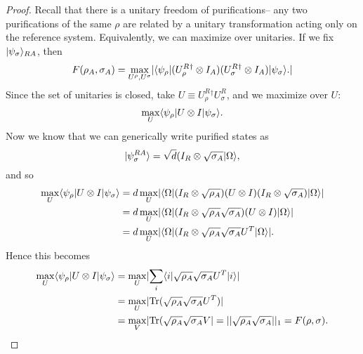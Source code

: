 \begin{thm}[Uhlmann]
\begin{proof}
        Recall that there is a unitary freedom of purifications-- any two purifications of the same $\rho$ are related by a unitary transformation acting only on the reference system. Equivalently, we can maximize over unitaries. If we fix $\lvert\psi_\sigma\rangle_{RA}$, then
        \begin{equation}
            F(\rho_A,\sigma_A)=\max_{U^\rho, U^\sigma} \lvert\langle\psi_\rho\rvert (U_\rho^R{}^\dagger \otimes I_A) (U_\sigma^R{}^\dagger \otimes I_A)\lvert\psi_\sigma\rangle.
            \rvert
        \end{equation}
        Since the set of unitaries is closed, take $U\equiv U_\rho^R{}^\dagger U_\sigma^R$, and we maximize over $U$:
        \begin{equation*}
            \max_U \langle\psi_\rho\rvert U\otimes I \lvert\psi_\sigma\rangle.
        \end{equation*}
        Now we know that we can generically write purified states as
        \begin{equation}
            \lvert\psi_\sigma^{RA}\rangle=\sqrt{d}(I_R \otimes \sqrt{\sigma_A} \lvert\Omega\rangle,
        \end{equation}
        and so
        \begin{align*}
            \max_U \langle\psi_\rho\rvert U\otimes I \lvert\psi_\sigma\rangle &= d\max_U \lvert\langle\Omega\rvert(I_R \otimes \sqrt{\rho_A})(U\otimes I)(I_R \otimes \sqrt{\sigma_A})\lvert\Omega\rangle
            \rvert\\
                &= d\max_U \lvert\langle\Omega\rvert(I_R \otimes \sqrt{\rho_A}\sqrt{\sigma_A})(U\otimes I)\lvert\Omega\rangle\rvert\\
                &=d\max_U \lvert\langle\Omega\rvert(I_R \otimes \sqrt{\rho_A}\sqrt{\sigma_A}U^T\lvert\Omega\rangle\rvert.
        \end{align*}
        Hence this becomes
        \begin{align*}
            \max_U \langle\psi_\rho\rvert U\otimes I \lvert\psi_\sigma\rangle&=\max_U \lvert\sum_i \langle i\rvert \sqrt{\rho_A}\sqrt{\sigma_A} U^T \lvert i\rangle\rvert\\
            &= \max_U \lvert\operatorname{Tr}(\sqrt{\rho_A}\sqrt{\sigma_A} U^T)\rvert\\
            &=\max_V \lvert\operatorname{Tr} (\sqrt{\rho_A}\sqrt{\sigma_A} V\rvert = ||\sqrt{\rho_A}\sqrt{\sigma_A}||_1 =F(\rho,\sigma).
        \end{align*}
    \end{proof}
\end{thm}